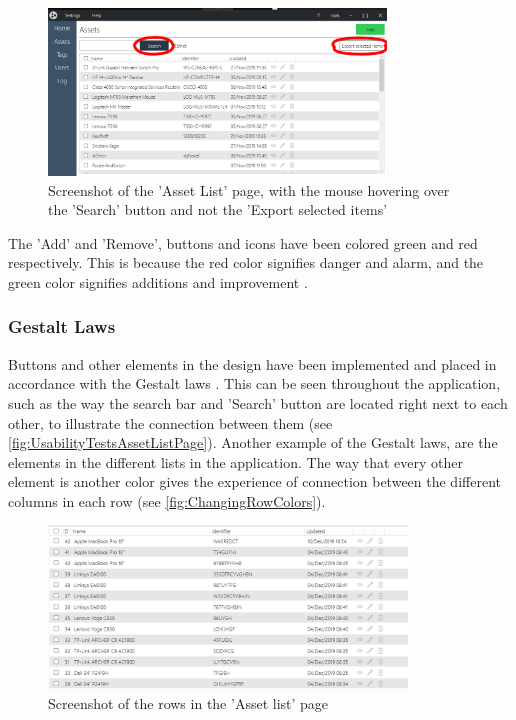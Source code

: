 \begin{figure}[H]
    \centering
    \includegraphics[width=0.8\textwidth]{figures/UIDesignElements/ButtonColors_AssetList.png}
    \caption{Screenshot of the 'Asset List' page, with the mouse hovering over the 'Search' button and not the 'Export selected items'}
    \label{fig:HoverColorAndBorderedButtons}
\end{figure}

The 'Add' and 'Remove', buttons and icons have been colored green and red respectively. This is because the red color signifies danger and alarm, and the green color signifies additions and improvement \citep{ColorTheory}\citep[Page 277]{DEB}.

\subsubsection*{Gestalt Laws}
Buttons and other elements in the design have been implemented and placed in accordance with the Gestalt laws \citep{GestaltLaws}. This can be seen throughout the application, such as the way the search bar and 'Search' button are located right next to each other, to illustrate the connection between them (see \autoref{fig:UsabilityTestsAssetListPage}). Another example of the Gestalt laws, are the elements in the different lists in the application. The way that every other element is another color gives the experience of connection between the different columns in each row (see \autoref{fig:ChangingRowColors}).

\begin{figure}[H]
    \centering
    \includegraphics[width=0.85\textwidth]{figures/UIDesignElements/DifferentColoredRows.png}
    \caption{Screenshot of the rows in the 'Asset list' page}
    \label{fig:ChangingRowColors}
\end{figure}

